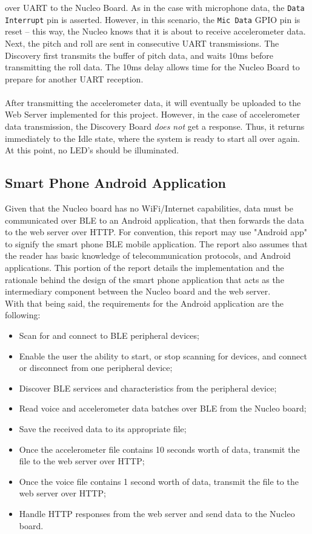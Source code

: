 over UART to the Nucleo Board. As in the case with microphone data, the \texttt{Data Interrupt} pin
is asserted. However, in this scenario, the \texttt{Mic Data} GPIO pin is reset -- this way, the
Nucleo knows that it is about to receive accelerometer data. Next, the pitch and roll are sent in
consecutive UART transmissions. The Discovery first transmits the buffer of pitch data, and waits
10ms before transmitting the roll data. The 10ms delay allows time for the Nucleo Board to prepare
for another UART reception.\\\\
After transmitting the accelerometer data, it will eventually be uploaded to the Web Server
implemented for this project. However, in the case of accelerometer data transmission, the Discovery
Board \textit{does not} get a response. Thus, it returns immediately to the Idle state, where the
system is ready to start all over again. At this point, no LED's should be illuminated.
\subsection{Smart Phone Android Application}

Given that the Nucleo board has no WiFi/Internet capabilities, data must be communicated over BLE to an Android application, that then forwards the data to the web server over HTTP. For convention, this report may use "Android app" to signify the smart phone BLE mobile application. The report also assumes that the reader has basic knowledge of telecommunication protocols, and Android applications. This portion of the report details the implementation and the rationale behind the design of the smart phone application that acts as the intermediary component between the Nucleo board and the web server.\\
With that being said, the requirements for the Android application are the following:

\begin{itemize}
    \item Scan for and connect to BLE peripheral devices;
    \item Enable the user the ability to start, or stop scanning for devices, and connect or disconnect from one peripheral device;
    \item Discover BLE services and characteristics from the peripheral device;
    \item Read voice and accelerometer data batches over BLE from the Nucleo board;
    \item Save the received data to its appropriate file;
    \item Once the accelerometer file contains 10 seconds worth of data, transmit the file to the web server over HTTP;
    \item Once the voice file contains 1 second worth of data, transmit the file to the web server over HTTP;
    \item Handle HTTP responses from the web server and send data to the Nucleo board.
\end{itemize}

